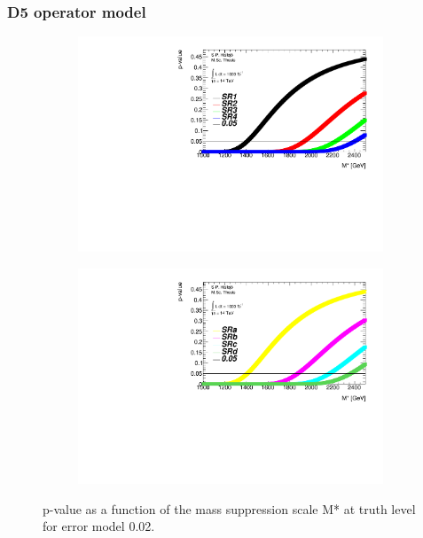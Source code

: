 \documentclass[handout]{beamer}
\begin{document}
\begin{frame}[shrink=10]\frametitle{D5 operator model}

\begin{figure}
        \centering
        \begin{subfigure}[b]{0.45\textwidth}
                \includegraphics[width=\textwidth]{pvald5002truth2.pdf}
        
        \end{subfigure}
        \hfill
        \begin{subfigure}[b]{0.45\textwidth}
                 \includegraphics[width=\textwidth]{pvald5002truth.pdf}
    
             
                 \end{subfigure}
    \caption{p-value as a function of the mass suppression scale M* at truth level for error model 0.02.}
             
\end{figure}
\end{frame}
\end{document}
